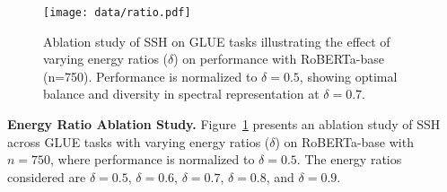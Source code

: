 \begin{figure}
    \centering
    \texttt{[image: data/ratio.pdf]}
    \caption{\small Ablation study of SSH on GLUE tasks illustrating the effect of varying energy ratios ($\delta$) on performance with RoBERTa-base (n=750). Performance is normalized to $\delta = 0.5$, showing optimal balance and diversity in spectral representation at $\delta = 0.7$.
}
    \label{fig:ratio}
\end{figure}



\noindent \textbf{Energy Ratio Ablation Study.}
\label{subsubsec:energyratio}
Figure~\ref{fig:ratio} presents an ablation study of SSH across GLUE tasks with varying energy ratios (\(\delta\)) on RoBERTa-base with \(n=750\), where performance is normalized to \(\delta = 0.5\). The energy ratios considered are \(\delta=0.5\), \(\delta=0.6\), \(\delta=0.7\), \(\delta=0.8\), and \(\delta=0.9\). 



